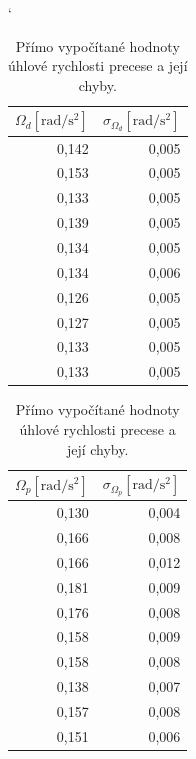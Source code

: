 \documentclass[english]{article}
\newcommand{\unit}[1]{\mathrm{#1}}
\begin{document}
\begin{table}[h!]
\catcode` %
\parbox{.45\linewidth}{
\centering
        \begin{tabular}{|r|r|}
        \hline
        $\Omega_d \unit{[ rad/s^2]}$ & $\sigma_{\Omega_d}\unit{ [rad/s^2]}$ \bigstrut\\
        \hline
        0,142 & 0,005 \bigstrut\\
        \hline
        0,153 & 0,005 \bigstrut\\
        \hline
        0,133 & 0,005 \bigstrut\\
        \hline
        0,139 & 0,005 \bigstrut\\
        \hline
        0,134 & 0,005 \bigstrut\\
        \hline
        0,134 & 0,006 \bigstrut\\
        \hline
        0,126 & 0,005 \bigstrut\\
        \hline
        0,127 & 0,005 \bigstrut\\
        \hline
        0,133 & 0,005 \bigstrut\\
        \hline
        0,133 & 0,005 \bigstrut\\
        \hline
        \end{tabular}%
    
      
   
  \caption{Nepřímo vypočítané hodnoty úhlové rychlosti precese (\ref{eq:precese_final}) a její chyby.}
    \label{tab:gyro_rychlost_data}%

}
\hfill
\parbox{.45\linewidth}{
\centering
      
         \begin{tabular}{|r|r|}
         \hline
         $\Omega_p \unit{[ rad/s^2]}$ & $\sigma_{\Omega_p}\unit{ [rad/s^2]}$ \bigstrut\\
         \hline
         0,130 & 0,004 \bigstrut\\
         \hline
         0,166 & 0,008 \bigstrut\\
         \hline
         0,166 & 0,012 \bigstrut\\
         \hline
         0,181 & 0,009 \bigstrut\\
         \hline
         0,176 & 0,008 \bigstrut\\
         \hline
         0,158 & 0,009 \bigstrut\\
         \hline
         0,158 & 0,008 \bigstrut\\
         \hline
         0,138 & 0,007 \bigstrut\\
         \hline
         0,157 & 0,008 \bigstrut\\
         \hline
         0,151 & 0,006 \bigstrut\\
         \hline
         \end{tabular}%
     
   
  \caption{Přímo vypočítané hodnoty úhlové rychlosti precese a její chyby.}
    \label{tab:gyro_precese_data}%

}

\end{table}
\end{document}
